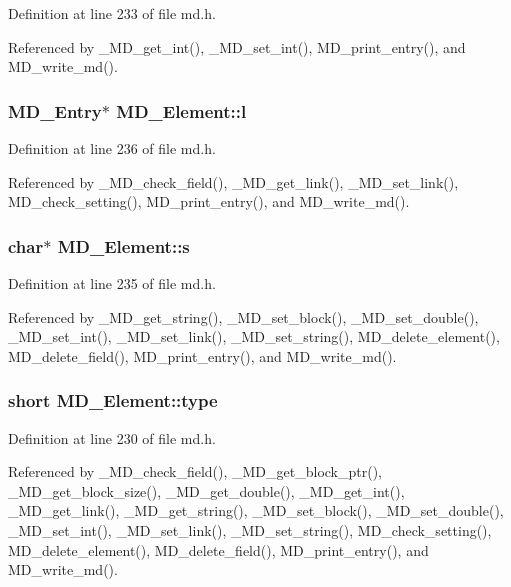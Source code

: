Definition at line 233 of file md.h.

Referenced by \_\-MD\_\-get\_\-int(), \_\-MD\_\-set\_\-int(), MD\_\-print\_\-entry(), and MD\_\-write\_\-md().
\subsubsection{\setlength{\rightskip}{0pt plus 5cm}\bf{MD\_\-Entry}$\ast$ \bf{MD\_\-Element::l}}\label{structMD__Element_f16a954a6b500572100e5f6cae9d8020}




Definition at line 236 of file md.h.

Referenced by \_\-MD\_\-check\_\-field(), \_\-MD\_\-get\_\-link(), \_\-MD\_\-set\_\-link(), MD\_\-check\_\-setting(), MD\_\-print\_\-entry(), and MD\_\-write\_\-md().
\subsubsection{\setlength{\rightskip}{0pt plus 5cm}char$\ast$ \bf{MD\_\-Element::s}}\label{structMD__Element_fd102024db6f2d789790317c799e782a}




Definition at line 235 of file md.h.

Referenced by \_\-MD\_\-get\_\-string(), \_\-MD\_\-set\_\-block(), \_\-MD\_\-set\_\-double(), \_\-MD\_\-set\_\-int(), \_\-MD\_\-set\_\-link(), \_\-MD\_\-set\_\-string(), MD\_\-delete\_\-element(), MD\_\-delete\_\-field(), MD\_\-print\_\-entry(), and MD\_\-write\_\-md().
\subsubsection{\setlength{\rightskip}{0pt plus 5cm}short \bf{MD\_\-Element::type}}\label{structMD__Element_c34e74cf17ccd87475b57333419766ed}




Definition at line 230 of file md.h.

Referenced by \_\-MD\_\-check\_\-field(), \_\-MD\_\-get\_\-block\_\-ptr(), \_\-MD\_\-get\_\-block\_\-size(), \_\-MD\_\-get\_\-double(), \_\-MD\_\-get\_\-int(), \_\-MD\_\-get\_\-link(), \_\-MD\_\-get\_\-string(), \_\-MD\_\-set\_\-block(), \_\-MD\_\-set\_\-double(), \_\-MD\_\-set\_\-int(), \_\-MD\_\-set\_\-link(), \_\-MD\_\-set\_\-string(), MD\_\-check\_\-setting(), MD\_\-delete\_\-element(), MD\_\-delete\_\-field(), MD\_\-print\_\-entry(), and MD\_\-write\_\-md().

